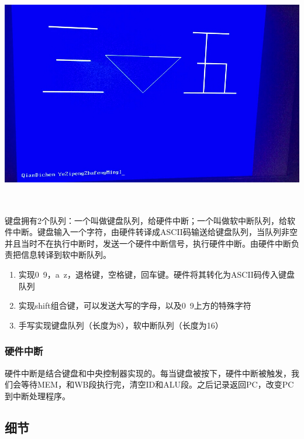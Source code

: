 \begin{center}
    \includegraphics[height=10cm]{image/extension/35.JPG}
    \label{fig:ifid}
\end{center}

键盘拥有2个队列：一个叫做键盘队列，给硬件中断；一个叫做软中断队列，给软件中断。键盘输入一个字符，由硬件转译成ASCII码输送给键盘队列，当队列非空并且当时不在执行中断时，发送一个硬件中断信号，执行硬件中断。由硬件中断负责把信息转译到软中断队列。

\begin{enumerate}
    \item 实现0~9，a~z，退格键，空格键，回车键。硬件将其转化为ASCII码传入键盘队列
    \item 实现shift组合键，可以发送大写的字母，以及0~9上方的特殊字符
    \item 手写实现键盘队列（长度为8），软中断队列（长度为16）
\end{enumerate}


\subsubsection{硬件中断}

硬件中断是结合键盘和中央控制器实现的。每当键盘被按下，硬件中断被触发，我们会等待MEM，和WB段执行完，清空ID和ALU段。之后记录返回PC，改变PC到中断处理程序。


\subsection{细节}

